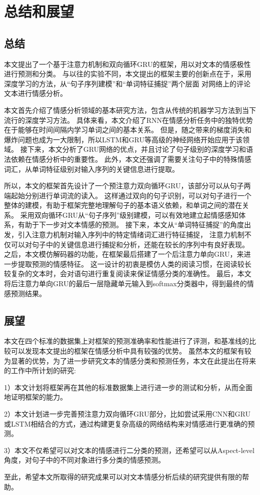 
\chapter{总结和展望}
\section{总结}
本文提出了一个基于注意力机制和双向循环GRU的框架，用以对文本的情感极性进行预测和分类。
与以往的实验不同，本文提出的框架主要的创新点在于，采用深度学习的方法，从“句子序列建模”和“单词特征捕捉”两个层面
对网络上的评论文本进行情感分析。

本文首先介绍了情感分析领域的基本研究方法，包含从传统的机器学习方法到当下流行的深度学习方法。
具体来看，本文介绍了RNN在情感分析任务中的独特优势在于能够在时间间隔内学习单词之间的基本关系。
但是，随之带来的梯度消失和爆炸问题也成为一大限制，所以LSTM和GRU等高级的神经网络开始应用于该领域。
接下来，本文分析了GRU网络的优点，并且讨论了句子级别的深度学习和语法依赖在情感分析中的重要性。
此外，本文还强调了需要关注句子中的特殊情感词汇，从单词特征级别对输入序列的关键信息进行提取。

所以，本文的框架首先设计了一个预注意力双向循环GRU，该部分可以从句子两端起始分别进行单词流的读入。
这样通过双向的句子识别，可以对句子进行一个整体的建模，有助于框架完整地理解句子的基本语义依赖，和单词之间的潜在关系。
采用双向循环GRU从“句子序列”级别建模，可以有效地建立起情感感知体系，有助于下一步对文本情感的预测。
接下来，本文从“单词特征捕捉”的角度出发，引入注意力机制对输入序列中的特定情绪词汇进行特征捕捉，
注意力机制不仅可以对句子中的关键信息进行捕捉和分析，还能在较长的序列中有良好表现。
之后，本文模仿解码器的功能，在框架最后搭建了一个后注意力单向GRU，来进一步提取预测的情感特征。
这一设计的初衷是模仿人类的阅读习惯，在阅读较长较复杂的文本时，会对语句进行重复阅读来保证情感分类的准确性。
最后，本文将后注意力单向GRU的最后一层隐藏单元输入到softmax分类器中，得到最终的情感预测结果。

\section{展望}
本文在四个标准的数据集上对框架的预测准确率和性能进行了评测，和基准线的比较可以发现本文提出的框架在情感分析中具有较强的优势。
虽然本文的框架有较为显著的优势，为了进一步研究文本的情感分类和预测任务，本文在此提出在将来的工作中所计划的研究:

1）本文计划将框架再在其他的标准数据集上进行进一步的测试和分析，从而全面地证明框架的能力。

2）本文计划进一步完善预注意力双向循环GRU部分，比如尝试采用CNN和GRU或LSTM相结合的方式，通过构建更复杂高级的网络结构来对情感进行更准确的预测。

3）本文不仅希望可以对文本的情感进行二分类的预测，还希望可以从Aspect-level角度，对句子中的不同对象进行多分类的情感预测。

至此，希望本文所取得的研究成果可以对文本情感分析后续的研究提供有限的帮助。